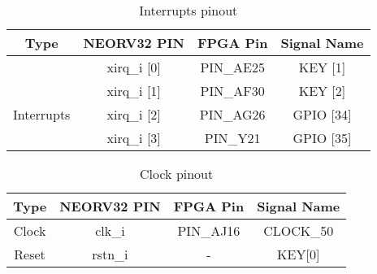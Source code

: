 \begin{table}[!htb]\scriptsize
    \centering
    \begin{tabular}{c c c c}
        \toprule[1.5pt]
        \textbf{Type} & \quad \quad \textbf{NEORV32 PIN} & \quad \quad \textbf{FPGA Pin} & \quad \quad \textbf{Signal Name}  \\
          
        \midrule
                    & \quad \quad xirq\_i [0]  & \quad \quad PIN\_AE25  & \quad \quad KEY [1]\\
                    & \quad \quad xirq\_i [1]  & \quad \quad PIN\_AF30  & \quad \quad KEY [2]\\
        Interrupts  & \quad \quad xirq\_i [2]  & \quad \quad PIN\_AG26  & \quad \quad GPIO [34]\\
                    & \quad \quad xirq\_i [3]  & \quad \quad PIN\_Y21   & \quad \quad GPIO [35]\\        
              
          \bottomrule[1.5pt]
         
    \end{tabular}
    \caption{\label{tab:xirq_i}Interrupts pinout}
\end{table}


\begin{table}[!htb]\scriptsize
    \centering
    \begin{tabular}{c c c c}
        \toprule[1.5pt]
        \textbf{Type} & \quad \quad \textbf{NEORV32 PIN} & \quad \quad \textbf{FPGA Pin} & \quad \quad \textbf{Signal Name}  \\
          
        \midrule
        Clock      & \quad \quad clk\_i & \quad \quad PIN\_AJ16  & \quad \quad CLOCK\_50\\
        Reset      & \quad \quad rstn\_i & \quad \quad -  & \quad \quad KEY[0]\\
   
          \bottomrule[1.5pt]
         
    \end{tabular}
    \caption{\label{tab:sys}Clock pinout}
\end{table}